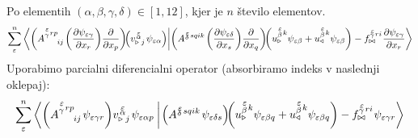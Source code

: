 Po elementih $(\alpha, \beta, \gamma, \delta) \in [1,12]$, kjer je $n$ število elementov.
\begin{equation}
   \sum^n_{\varepsilon}
   \braket{
      \qty(A^{\substack{\mkern2mu \varepsilon \\[0.12mm] \gamma} \mkern2mu r p}_{\mkern29mu i j} \mkern2mu    \qty( \pdv{\psi_{ \varepsilon \gamma}}{x_r} ) \frac{\partial}{\partial x_p} ) \mkern-4mu
      \qty(v^{\mkern 2mu \substack{\varepsilon \\[-0.7mm] \alpha \\[-0.2mm]}}_{\triangleright \mkern5mu j} \mkern2mu \psi_{\varepsilon \alpha} )}
   {
      \qty(A^{\substack{\mkern2mu \varepsilon \\[-0.59mm] \delta} \mkern2mu s q i k} \mkern2mu     \qty( \pdv{\psi_{\varepsilon \delta}}{x_s} ) \frac{\partial}{\partial x_q} ) \mkern-4mu
      \qty(u^{\substack{\mkern2mu \varepsilon \\[0.14mm] \beta} \mkern2mu k}_\triangleright     \psi_{\varepsilon \beta} + u^{\substack{\mkern2mu \varepsilon \\[0.14mm] \beta} \mkern2mu k}_\triangleleft     \psi_{\varepsilon \beta} )
      -
      f^{\substack{\mkern2mu \varepsilon \\[-0.59mm] \gamma} \mkern2mu r i}_{\bowtie} \mkern1mu
      \pdv{\psi_{\varepsilon \gamma}}{x_r}}
\end{equation}
Uporabimo parcialni diferencialni operator (absorbiramo indeks v naslednji oklepaj):
\begin{equation*}
   \sum^n_\varepsilon
   \braket{
      \qty( A^{\substack{\mkern2mu \varepsilon \\[0.15mm] \gamma} \mkern2mu r p}_{\mkern29mu i j} \mkern2mu     \psi_{ \varepsilon \gamma r} )
      v^{\mkern 2mu \substack{\varepsilon \\[-0.59mm] \alpha \\[-0.2mm]}}_{\triangleright \mkern5mu j} \mkern2mu \psi_{\varepsilon \alpha p} \mkern4mu}
   {
      \mkern2mu \qty( A^{\substack{\mkern2mu \varepsilon \\[-0.59mm] \delta} \mkern2mu s q i k} \mkern2mu     \psi_{\varepsilon \delta s} ) \mkern-4mu 
      \qty( u^{\substack{\mkern2mu \varepsilon \\[0.14mm] \beta} \mkern2mu k}_\triangleright     \psi_{\varepsilon \beta q} + u^{\substack{\mkern2mu \varepsilon \\[0.14mm] \beta} \mkern2mu k}_\triangleleft     \psi_{\varepsilon \beta q} )
      -
      f^{\substack{\mkern2mu \varepsilon \\[-0.59mm] \gamma} \mkern2mu r i}_{\bowtie} \mkern1mu
      \psi_{\varepsilon \gamma r} }
\end{equation*}
